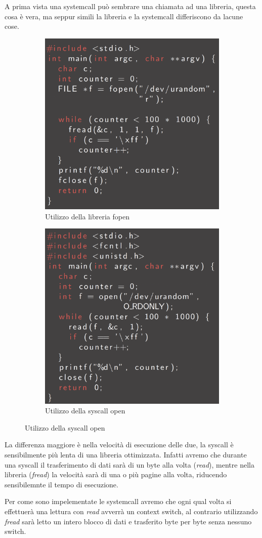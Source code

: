 A prima vista una systemcall può sembrare una chiamata ad una libreria, questa cosa è vera, ma seppur simili la libreria e la systemcall differiscono da lacune cose.
\begin{figure}[h!]
    \centering
    \begin{subfigure}{.5\textwidth}
      \centering
      \includegraphics[width=.5\linewidth]{res/fopen_library.png}
      \caption{Utilizzo della libreria fopen}
    \end{subfigure}%
    \begin{subfigure}{.5\textwidth}
      \centering
      \includegraphics[width=.5\linewidth]{res/open_library.png}
      \caption{Utilizzo della syscall open}
    \end{subfigure}
\end{figure}

La differenza maggiore è nella velocità di esecuzione delle due, la syscall è sensibilmente più lenta di una libreria ottimizzata.
Infatti avremo che durante una syscall il trasferimento di dati sarà di un byte alla volta (\textit{read}), mentre nella libreria (\textit{fread}) la velocità sarà di una o più pagine alla volta, riducendo sensibilemnte il tempo di esecuzione.

Per come sono impelementate le systemcall avremo che ogni qual volta si effettuerà una lettura con \textit{read} avverrà un context switch, al contrario utilizzando \textit{fread} sarà letto un intero blocco di dati e trasferito byte per byte senza nessuno switch.


